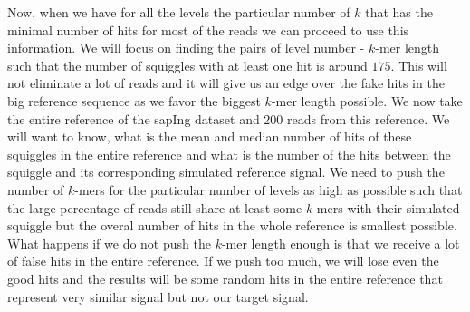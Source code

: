 Now, when we have for all the levels the particular number of $k$ that
has the minimal number of hits for most of the reads we can proceed to use
this information. We will focus on finding the pairs of level number - $k$-mer length
such that the number of squiggles with at least one hit is around $175$. This
will not eliminate a lot of reads and it will give us an edge over the fake hits in the
big reference sequence as we favor the biggest $k$-mer length possible.
We now take the entire reference of the sapIng dataset and $200$ reads from this
reference. We will want to know, what is the mean and median number of hits of
these squiggles in the entire reference and what is the number of the hits between
the squiggle and its corresponding simulated reference signal. We need to push the number of $k$-mers
for the particular number of levels as high as possible such that the large percentage
of reads still share at least some $k$-mers with their simulated squiggle but the
overal number of hits in the whole reference is smallest possible. What happens
if we do not push the $k$-mer length enough is that we receive a lot of false hits in
the entire reference. If we push too much, we will lose even the good hits and the
results will be some random hits in the entire reference that represent very similar
signal but not our target signal.

